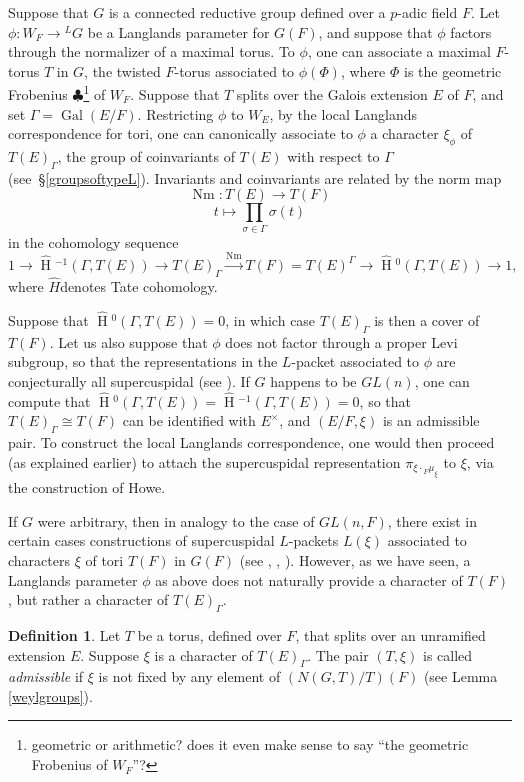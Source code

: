 \documentclass[11pt]{amsart}
\theoremstyle{plain}
\newcommand{\MAxxx}[1]{$\clubsuit$\footnote{#1}}
\newcommand{\HT}[1]{\hat{\HH}{}^{#1}}
\theoremstyle{definition}
\newtheorem{definition}[theorem]{Definition}
\DeclareMathOperator{\Gal}{Gal}
\DeclareMathOperator{\HH}{H}
\DeclareMathOperator{\Nm}{Nm}
\begin{document}
Suppose that $G$ is a connected reductive group defined over a
$p$-adic field $F$.  Let $\phi : W_F \rightarrow {}^L G$ be a
Langlands parameter for $G(F)$, and suppose that $\phi$ factors
through the normalizer of a maximal torus. To $\phi$, one can
associate a maximal $F$-torus $T$ in $G$, the twisted $F$-torus
associated to $\phi(\Phi)$, where $\Phi$ is the geometric Frobenius
\MAxxx{geometric or arithmetic?  does it even make sense to say ``the
  geometric Frobenius of $W_F$''?} of $W_F$.  Suppose that $T$ splits
over the Galois extension $E$ of $F$, and set $\Gamma = \Gal(E/F)$.
Restricting $\phi$ to $W_E$, by the local Langlands correspondence for
tori, one can canonically associate to $\phi$ a character $\xi_{\phi}$
of $T(E)_{\Gamma}$, the group of coinvariants of $T(E)$ with respect
to $\Gamma$ (see~\S\ref{groupsoftypeL}).  Invariants and coinvariants
are related by the norm map
$$\Nm : T(E) \rightarrow T(F)$$ $$t \mapsto \displaystyle\prod_{\sigma \in \Gamma} \sigma(t)$$
in the cohomology sequence
$$1 \rightarrow \HT{-1}(\Gamma,T(E)) \rightarrow T(E)_{\Gamma} \xrightarrow{\Nm} T(F)
= T(E)^{\Gamma} \rightarrow \HT{0}(\Gamma,T(E)) \rightarrow 1,$$
where $\hat{H}$denotes Tate cohomology.

Suppose that $\HT{0}(\Gamma, T(E)) = 0$, in which case
$T(E)_{\Gamma}$ is then a cover of $T(F)$.  Let us also suppose that
$\phi$ does not factor through a proper Levi subgroup, so that the
representations in the $L$-packet associated to $\phi$ are
conjecturally all supercuspidal (see \cite[\S 3.5]{debackerreeder}).
If $G$ happens to be $GL(n)$, one can compute that
$\HT{0}(\Gamma, T(E)) = \HT{-1}(\Gamma, T(E)) = 0$, so that
$T(E)_{\Gamma} \cong T(F)$ can be identified with $E^{\times}$, and
$(E/F, \xi)$ is an admissible pair.  To construct the local Langlands
correspondence, one would then proceed (as explained earlier) to
attach the supercuspidal representation $\pi_{\xi \cdot {}_F
  \mu_{\xi}}$ to $\xi$, via the construction of Howe.

If $G$ were arbitrary, then in analogy to the case of $GL(n,F)$, there
exist in certain cases constructions of supercuspidal $L$-packets
$L(\xi)$ associated to characters $\xi$ of tori $T(F)$ in $G(F)$ (see
\cite{debackerreeder}, \cite{kaletha}, \cite{reeder}).  However, as we
have seen, a Langlands parameter $\phi$ as above does not naturally
provide a character of $T(F)$, but rather a character of
$T(E)_{\Gamma}$.

\begin{definition}
Let $T$ be a torus, defined over $F$, that splits over an unramified
  extension $E$.  Suppose $\xi$ is a character of $T(E)_{\Gamma}$.
The pair $(T, \xi)$ is called \emph{admissible} if $\xi$ is not fixed
by any element of $(N(G,T)/T)(F)$ (see Lemma \ref{weylgroups}).
\end{definition}
\end{document}
